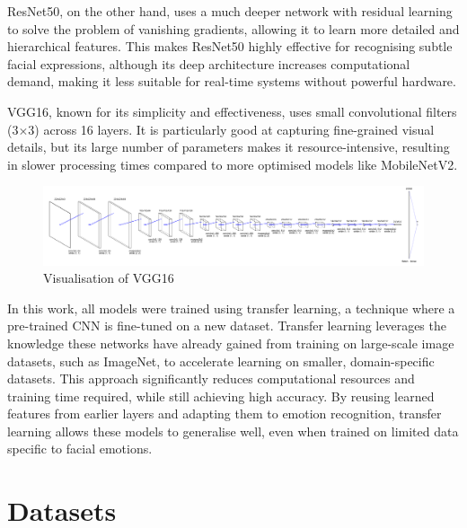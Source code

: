 ResNet50, on the other hand, uses a much deeper network with residual learning to solve the problem of vanishing gradients, allowing it to learn more detailed and hierarchical features. This makes ResNet50 highly effective for recognising subtle facial expressions, although its deep architecture increases computational demand, making it less suitable for real-time systems without powerful hardware.

VGG16, known for its simplicity and effectiveness, uses small convolutional filters (3\(\times\)3) across 16 layers. It is particularly good at capturing fine-grained visual details, but its large number of parameters makes it resource-intensive, resulting in slower processing times compared to more optimised models like MobileNetV2.

\begin{figure}[!htb]
    \centering{}
    \includegraphics[scale=0.15]{m+m_images/VGG16.png}
    \caption{Visualisation of VGG16}
    \label{figure:vggresnetmobilenet}
\end{figure}

In this work, all models were trained using transfer learning, a technique where a pre-trained CNN is fine-tuned on a new dataset. Transfer learning leverages the knowledge these networks have already gained from training on large-scale image datasets, such as ImageNet, to accelerate learning on smaller, domain-specific datasets. This approach significantly reduces computational resources and training time required, while still achieving high accuracy. By reusing learned features from earlier layers and adapting them to emotion recognition, transfer learning allows these models to generalise well, even when trained on limited data specific to facial emotions.

\section{Datasets}